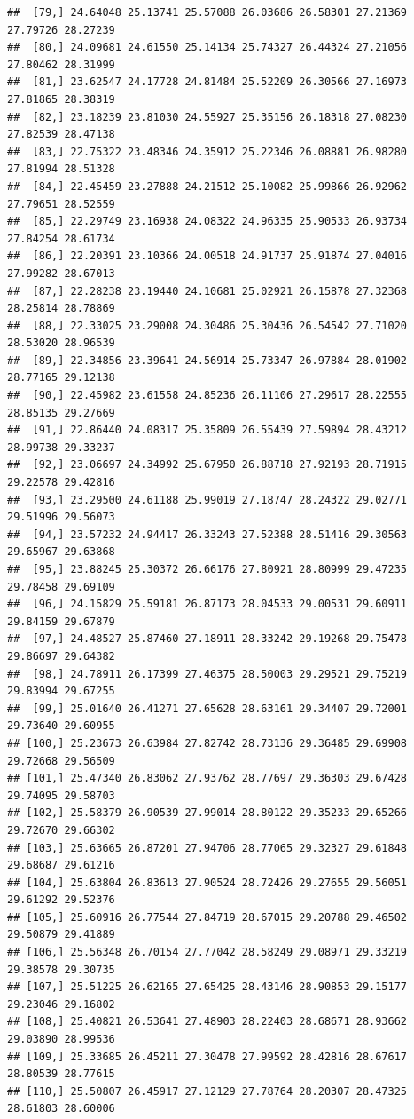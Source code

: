 \documentclass{article}\usepackage[]{graphicx}\usepackage[]{color}
\makeatletter
\newenvironment{kframe}{%
 \def\at@end@of@kframe{}%
 \ifinner\ifhmode%
  \def\at@end@of@kframe{\end{minipage}}%
  \begin{minipage}{\columnwidth}%
 \fi\fi%
 \def\FrameCommand##1{\hskip\@totalleftmargin \hskip-\fboxsep
 \colorbox{shadecolor}{##1}\hskip-\fboxsep
     \hskip-\linewidth \hskip-\@totalleftmargin \hskip\columnwidth}%
 \MakeFramed {\advance\hsize-\width
   \@totalleftmargin\z@ \linewidth\hsize
   \@setminipage}}%
 {\par\unskip\endMakeFramed%
 \at@end@of@kframe}
\newenvironment{knitrout}{}{} %
\makeatother
\begin{document}
\begin{knitrout}
\begin{kframe}
\begin{verbatim}
##  [79,] 24.64048 25.13741 25.57088 26.03686 26.58301 27.21369 27.79726 28.27239
##  [80,] 24.09681 24.61550 25.14134 25.74327 26.44324 27.21056 27.80462 28.31999
##  [81,] 23.62547 24.17728 24.81484 25.52209 26.30566 27.16973 27.81865 28.38319
##  [82,] 23.18239 23.81030 24.55927 25.35156 26.18318 27.08230 27.82539 28.47138
##  [83,] 22.75322 23.48346 24.35912 25.22346 26.08881 26.98280 27.81994 28.51328
##  [84,] 22.45459 23.27888 24.21512 25.10082 25.99866 26.92962 27.79651 28.52559
##  [85,] 22.29749 23.16938 24.08322 24.96335 25.90533 26.93734 27.84254 28.61734
##  [86,] 22.20391 23.10366 24.00518 24.91737 25.91874 27.04016 27.99282 28.67013
##  [87,] 22.28238 23.19440 24.10681 25.02921 26.15878 27.32368 28.25814 28.78869
##  [88,] 22.33025 23.29008 24.30486 25.30436 26.54542 27.71020 28.53020 28.96539
##  [89,] 22.34856 23.39641 24.56914 25.73347 26.97884 28.01902 28.77165 29.12138
##  [90,] 22.45982 23.61558 24.85236 26.11106 27.29617 28.22555 28.85135 29.27669
##  [91,] 22.86440 24.08317 25.35809 26.55439 27.59894 28.43212 28.99738 29.33237
##  [92,] 23.06697 24.34992 25.67950 26.88718 27.92193 28.71915 29.22578 29.42816
##  [93,] 23.29500 24.61188 25.99019 27.18747 28.24322 29.02771 29.51996 29.56073
##  [94,] 23.57232 24.94417 26.33243 27.52388 28.51416 29.30563 29.65967 29.63868
##  [95,] 23.88245 25.30372 26.66176 27.80921 28.80999 29.47235 29.78458 29.69109
##  [96,] 24.15829 25.59181 26.87173 28.04533 29.00531 29.60911 29.84159 29.67879
##  [97,] 24.48527 25.87460 27.18911 28.33242 29.19268 29.75478 29.86697 29.64382
##  [98,] 24.78911 26.17399 27.46375 28.50003 29.29521 29.75219 29.83994 29.67255
##  [99,] 25.01640 26.41271 27.65628 28.63161 29.34407 29.72001 29.73640 29.60955
## [100,] 25.23673 26.63984 27.82742 28.73136 29.36485 29.69908 29.72668 29.56509
## [101,] 25.47340 26.83062 27.93762 28.77697 29.36303 29.67428 29.74095 29.58703
## [102,] 25.58379 26.90539 27.99014 28.80122 29.35233 29.65266 29.72670 29.66302
## [103,] 25.63665 26.87201 27.94706 28.77065 29.32327 29.61848 29.68687 29.61216
## [104,] 25.63804 26.83613 27.90524 28.72426 29.27655 29.56051 29.61292 29.52376
## [105,] 25.60916 26.77544 27.84719 28.67015 29.20788 29.46502 29.50879 29.41889
## [106,] 25.56348 26.70154 27.77042 28.58249 29.08971 29.33219 29.38578 29.30735
## [107,] 25.51225 26.62165 27.65425 28.43146 28.90853 29.15177 29.23046 29.16802
## [108,] 25.40821 26.53641 27.48903 28.22403 28.68671 28.93662 29.03890 28.99536
## [109,] 25.33685 26.45211 27.30478 27.99592 28.42816 28.67617 28.80539 28.77615
## [110,] 25.50807 26.45917 27.12129 27.78764 28.20307 28.47325 28.61803 28.60006

\end{verbatim}
\end{kframe}
\end{knitrout}
\end{document}
